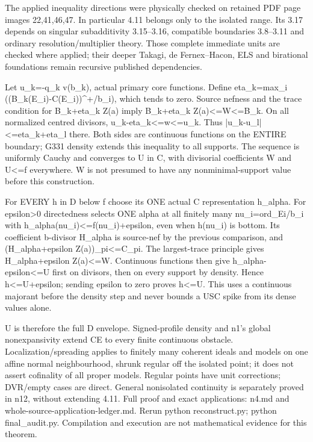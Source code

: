 \documentclass[11pt]{article}
\begin{document}
The applied inequality directions were physically checked on retained PDF page images 22,41,46,47. In particular 4.11 belongs only to the isolated range. Its 3.17 depends on singular subadditivity 3.15--3.16, compatible boundaries 3.8--3.11 and ordinary resolution/multiplier theory. Those complete immediate units are checked where applied; their deeper Takagi, de Fernex--Hacon, ELS and birational foundations remain recursive published dependencies.

Let u\_k=-q\_k v(b\_k), actual primary core functions. Define eta\_k=max\_i ((B\_k(E\_i)-C(E\_i))\textasciicircum{}+/b\_i), which tends to zero. Source nefness and the trace condition for B\_k+eta\_k Z(a) imply B\_k+eta\_k Z(a)<=W<=B\_k. On all normalized centred divisors, u\_k-eta\_k<=w<=u\_k. Thus |u\_k-u\_l|<=eta\_k+eta\_l there. Both sides are continuous functions on the ENTIRE boundary; G331 density extends this inequality to all supports. The sequence is uniformly Cauchy and converges to U in C, with divisorial coefficients W and U<=f everywhere. W is not presumed to have any nonminimal-support value before this construction.

For EVERY h in D below f choose its ONE actual C representation h\_alpha. For epsilon>0 directedness selects ONE alpha at all finitely many nu\_i=ord\_Ei/b\_i with h\_alpha(nu\_i)<=f(nu\_i)+epsilon, even when h(nu\_i) is bottom. Its coefficient b-divisor H\_alpha is source-nef by the previous comparison, and (H\_alpha+epsilon Z(a))\_pi<=C\_pi. The largest-trace principle gives H\_alpha+epsilon Z(a)<=W. Continuous functions then give h\_alpha-epsilon<=U first on divisors, then on every support by density. Hence h<=U+epsilon; sending epsilon to zero proves h<=U. This uses a continuous majorant before the density step and never bounds a USC spike from its dense values alone.

U is therefore the full D envelope. Signed-profile density and n1's global nonexpansivity extend CE to every finite continuous obstacle. Localization/spreading applies to finitely many coherent ideals and models on one affine normal neighbourhood, shrunk regular off the isolated point; it does not assert cofinality of all proper models. Regular points have unit corrections; DVR/empty cases are direct. General nonisolated continuity is separately proved in n12, without extending 4.11. Full proof and exact applications: n4.md and whole-source-application-ledger.md. Rerun python reconstruct.py; python final\_audit.py. Compilation and execution are not mathematical evidence for this theorem.
\end{document}
